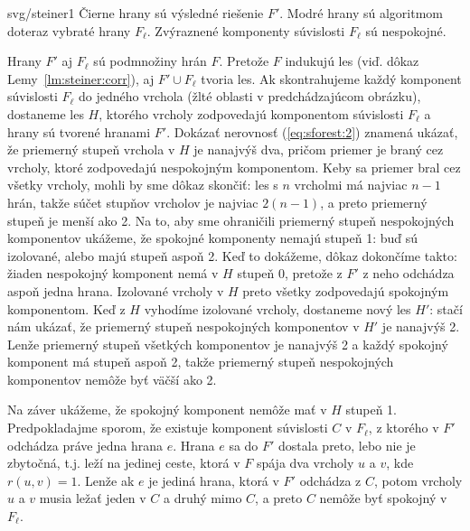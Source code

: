 \begin{dokaz}
\begin{myfig}{0.8\textwidth}{svg/steiner1}
Čierne hrany sú výsledné riešenie $F'$. Modré hrany sú 
algoritmom doteraz vybraté hrany $F_\ell$. 
Zvýraznené komponenty súvislosti $F_\ell$ sú nespokojné.
\end{myfig}

\noindent
Hrany $F'$ aj $F_\ell$ sú podmnožiny hrán $F$. Pretože $F$ indukujú les (viď. dôkaz Lemy~\ref{lm:steiner:corr}),
aj $F'\cup F_\ell$ tvoria les. Ak skontrahujeme každý komponent súvislosti $F_\ell$ do jedného vrchola (žlté
oblasti v predchádzajúcom obrázku), dostaneme les $H$, ktorého vrcholy zodpovedajú komponentom súvislosti $F_\ell$ a
hrany sú tvorené hranami $F'$. Dokázať nerovnosť   (\ref{eq:sforest:2}) znamená ukázať, že priemerný stupeň
vrchola v $H$ je nanajvýš dva, pričom priemer je braný cez vrcholy, ktoré zodpovedajú nespokojným komponentom.
Keby sa priemer bral cez všetky vrcholy, mohli by sme dôkaz skončiť: les s $n$ vrcholmi má najviac $n-1$ hrán,
takže súčet stupňov vrcholov je najviac $2(n-1)$, a preto priemerný stupeň je menší ako 2. 
Na to, aby sme ohraničili priemerný stupeň nespokojných komponentov ukážeme, že spokojné
komponenty nemajú stupeň 1: buď sú izolované, alebo majú stupeň aspoň 2. 
Keď to dokážeme, dôkaz dokončíme takto: žiaden nespokojný komponent nemá v $H$ stupeň 0, pretože
z $F'$ z neho odchádza aspoň jedna hrana. Izolované vrcholy v $H$ preto všetky zodpovedajú spokojným komponentom.
Keď z $H$ vyhodíme izolované vrcholy, dostaneme nový les $H'$: stačí nám ukázať, že priemerný stupeň 
nespokojných komponentov v $H'$ je nanajvýš 2. Lenže priemerný stupeň všetkých komponentov je nanajvýš 2 a každý
spokojný komponent má stupeň aspoň 2, takže priemerný stupeň nespokojných komponentov nemôže byť väčší ako 2.

Na záver ukážeme, že spokojný komponent nemôže mať v $H$ stupeň 1. Predpokladajme sporom, že existuje
komponent súvislosti $C$ v $F_\ell$, 
z ktorého v $F'$ odchádza práve jedna hrana $e$. Hrana $e$ sa do $F'$ dostala preto,
lebo nie je zbytočná, t.j. leží na jedinej ceste, ktorá v $F$ spája dva vrcholy $u$ a $v$, kde $r(u,v)=1$.
Lenže  ak $e$ je jediná hrana, ktorá v $F'$ odchádza z $C$, potom vrcholy $u$ a $v$ musia ležať jeden v $C$
a druhý mimo $C$, a preto $C$ nemôže byť spokojný v $F_\ell$.
\end{dokaz}

